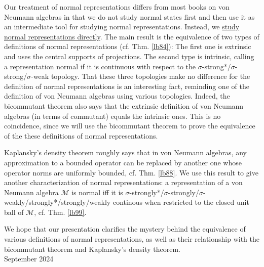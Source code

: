\documentclass[12pt,b5paper,notitlepage]{article}
\theoremstyle{definition}
\theoremstyle{plain}
\newcommand{\mc}{\mathcal}
\numberwithin{equation}{section}
\begin{document}
Our treatment of normal representations differs from most books on von Neumann algebras in that we do not study normal states first and then use it as an intermediate tool for studying normal representations. Instead, we \uline{study normal representations directly}. The main result is the equivalence of two types of definitions of normal representations (cf. Thm. \ref{lb84}): The first one is extrinsic and uses the central supports of projections. The second type is intrinsic, calling a representation normal if it is continuous with respect to the $\sigma$-strong*/$\sigma$-strong/$\sigma$-weak topology. That these three topologies make no difference for the definition of normal representations is an interesting fact, reminding one of the definition of von Neumann algebras using various topologies. Indeed, the bicommutant theorem also says that the extrinsic definition of von Neumann algebras (in terms of commutant) equals the intrinsic ones. This is no coincidence, since we will use the bicommutant theorem to prove the equivalence of the these definitions of normal representations.


Kaplansky's density theorem roughly says that in von Neumann algebras, any approximation to a bounded operator can be replaced by another one whose operator norms are uniformly bounded, cf. Thm. \ref{lb88}. We use this result to give another characterization of normal representations: a representation of a von Neumann algebra $\mc M$ is normal iff it is $\sigma$-strongly*/$\sigma$-strongly/$\sigma$-weakly/strongly*/strongly/weakly continous when restricted to the closed unit ball of $\mc M$, cf. Thm. \ref{lb99}.

We hope that our presentation clarifies the mystery behind the equivalence of various definitions of normal representations, as well as their relationship with the bicommutant theorem and Kaplansky's density theorem.\\[2ex]


\hfill September 2024







 
\end{document}
